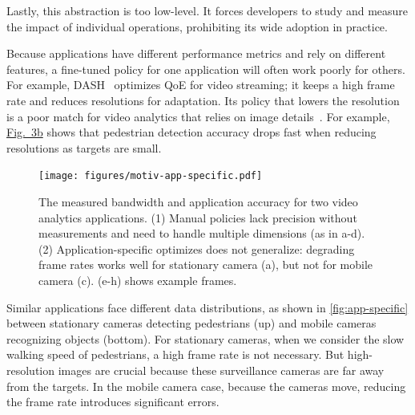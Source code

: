 Lastly, this abstraction is too low-level. It forces developers to study and
measure the impact of individual operations, prohibiting its wide adoption in
practice.

 Because
applications have different performance metrics and rely on different features,
a fine-tuned policy for one application will often work poorly for others. For
example, DASH~\cite{sodagar2011mpeg} optimizes QoE for video streaming; it keeps
a high frame rate and reduces resolutions for adaptation. Its policy that lowers
the resolution is a poor match for video analytics that relies on image
details~\cite{lowe2004distinctive, viola2001rapid}. For example,
\hyperref[fig:app-specific]{Fig.~3b} shows that pedestrian detection accuracy
drops fast when reducing resolutions as targets are small.

\begin{figure}
  \centering
  \texttt{[image: figures/motiv-app-specific.pdf]}
  \caption{The measured bandwidth and application accuracy for two video
    analytics applications. (1) Manual policies lack precision without
    measurements and need to handle multiple dimensions (as in a-d). (2)
    Application-specific optimizes does not generalize: degrading frame rates
    works well for stationary camera (a), but not for mobile camera (c). (e-h)
    shows example frames.}
  \label{fig:app-specific}
  \vspace{-1em}
\end{figure}

Similar applications face different data distributions, as shown in
\autoref{fig:app-specific} between stationary cameras detecting pedestrians (up)
and mobile cameras recognizing objects (bottom). For stationary cameras, when we
consider the slow walking speed of pedestrians, a high frame rate is not
necessary. But high-resolution images are crucial because these surveillance
cameras are far away from the targets. In the mobile camera case, because the
cameras move, reducing the frame rate introduces significant errors.


